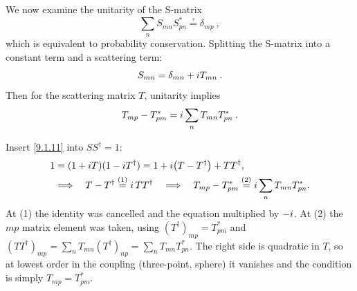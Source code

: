 We now examine the unitarity of the S-matrix
\begin{equation}
	\sum_{n} S_{mn} S_{pn}^{*} \questeq \delta_{mp} \:, \label{9.1.10}
\end{equation}
which is equivalent to probability conservation. Splitting the S-matrix into a constant term and a scattering term:
\begin{equation}
	S_{mn} = \delta_{mn} + i T_{mn} \:.
	\label{9.1.11}
\end{equation}
Then for the scattering matrix $T$, unitarity implies
\begin{equation}
	T_{mp} - T_{pm}^{*} = i \sum_{n} T_{mn} T_{pn}^{*} \:. \label{9.1.12}
\end{equation}
\begin{tcolorbox}[breakable]
	\begin{remark}
		Insert \eqref{9.1.11} into $SS^\dagger=1$:
		\begin{align*}
			1 &= (1+i T)(1-i T^\dagger)
			= 1+i\bigl(T-T^\dagger\bigr)+TT^\dagger ,\\
			&\Longrightarrow\quad
			T-T^\dagger \overset{(1)}{=} i\,TT^\dagger
			\quad\Longrightarrow\quad
			T_{mp}-T^{*}_{pm} \overset{(2)}{=} i\sum_n T_{mn}T^{*}_{pn} .
		\end{align*}
		At (1) the identity was cancelled and the equation multiplied by $-i$. At (2) the $mp$ matrix element was taken, using $(T^\dagger)_{mp}=T^{*}_{pm}$ and $(TT^\dagger)_{mp}=\sum_n T_{mn}(T^\dagger)_{np}=\sum_n T_{mn}T^{*}_{pn}$. The right side is quadratic in $T$, so at lowest order in the coupling (three-point, sphere) it vanishes and the condition is simply $T_{mp}=T^{*}_{pm}$.
	\end{remark}
\end{tcolorbox}

